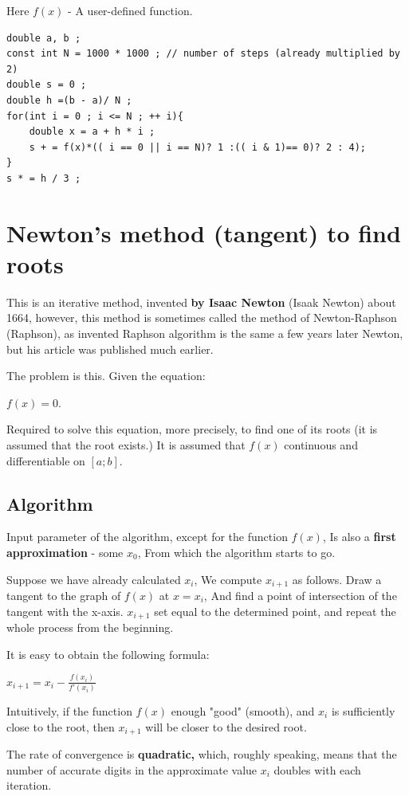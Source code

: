 Here $f (x)$ - A user-defined function.

\begin{verbatim}
double a, b ;
const int N = 1000 * 1000 ; // number of steps (already multiplied by 2)
double s = 0 ;
double h =(b - a)/ N ;
for(int i = 0 ; i <= N ; ++ i){
    double x = a + h * i ;
    s + = f(x)*(( i == 0 || i == N)? 1 :(( i & 1)== 0)? 2 : 4);
}
s * = h / 3 ; 
\end{verbatim}

\section{ Newton's method (tangent) to find roots }
This is an iterative method, invented \textbf{by Isaac Newton} (Isaak Newton) about 1664, however, this method is sometimes called the method of Newton-Raphson (Raphson), as invented Raphson algorithm is the same a few years later Newton, but his article was published much earlier.

The problem is this. Given the equation:

$f (x) = 0.$

Required to solve this equation, more precisely, to find one of its roots (it is assumed that the root exists.) It is assumed that $f (x)$ continuous and differentiable on $[a; b]$.

\subsection{ Algorithm }

Input parameter of the algorithm, except for the function $f (x)$, Is also a \textbf{first approximation} - some $x_0$, From which the algorithm starts to go.

Suppose we have already calculated $x_i$, We compute $x_ {i +1}$ as follows. Draw a tangent to the graph of $f (x)$ at $x = x_i$, And find a point of intersection of the tangent with the x-axis. $x_ {i +1}$ set equal to the determined point, and repeat the whole process from the beginning.

It is easy to obtain the following formula:

$x_{i+1}=x_{i}-\frac{f(x_{i})}{f'(x_{i})}$

Intuitively, if the function $f (x)$ enough "good" (smooth), and $x_i$ is sufficiently close to the root, then $x_ {i +1}$ will be closer to the desired root.

The rate of convergence is \textbf{quadratic,} which, roughly speaking, means that the number of accurate digits in the approximate value $x_i$ doubles with each iteration.

